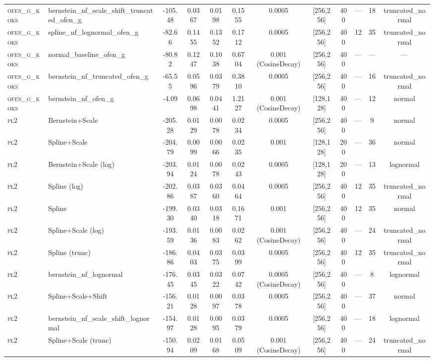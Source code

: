 \begin{table}[htbp]
\begin{tabular}{llS[table-format=-4.2]S[table-format=-4.2]S[table-format=-1.4]S[table-format=-1.4]cccccc}
\textsc{ofen\_g\_koks} & bernstein_nf_scale_shift_truncated_ofen_g & -105.48 & 0.0367 & 0.0198 & 0.1555 & 0.0005 & [256,256] & 400 & — & 18 & truncated_normal \\
\textsc{ofen\_g\_koks} & spline_nf_lognormal_ofen_g & -82.66 & 0.1455 & 0.1352 & 0.1712 & 0.0005 & [256,256] & 400 & 12 & 35 & truncated_normal \\
\textsc{ofen\_g\_koks} & normal_baseline_ofen_g & -80.82 & 0.1247 & 0.1038 & 0.6704 & 0.001 (CosineDecay) & [256,256] & 400 & — & — & — \\
\textsc{ofen\_g\_koks} & bernstein_nf_truncated_ofen_g & -65.55 & 0.0596 & 0.0379 & 0.3810 & 0.0005 & [256,256] & 400 & — & 16 & truncated_normal \\
\textsc{ofen\_g\_koks} & bernstein_nf_ofen_g & -4.09 & 0.0698 & 0.0441 & 1.2127 & 0.001 (CosineDecay) & [128,128] & 400 & — & 12 & normal \\
\textsc{pl2} & Bernstein+Scale & -205.28 & 0.0129 & 0.0078 & 0.0234 & 0.0005 & [256,256] & 400 & — & 9 & normal \\
\textsc{pl2} & Spline+Scale & -204.79 & 0.0099 & 0.0066 & 0.0235 & 0.001 & [128,128] & 200 & — & 36 & normal \\
\textsc{pl2} & Bernstein+Scale (log) & -203.94 & 0.0124 & 0.0078 & 0.0243 & 0.0005 & [128,128] & 200 & — & 13 & lognormal \\
\textsc{pl2} & Spline (log) & -202.86 & 0.0387 & 0.0360 & 0.0464 & 0.0005 & [256,256] & 400 & 12 & 35 & truncated_normal \\
\textsc{pl2} & Spline & -199.30 & 0.0340 & 0.0318 & 0.1671 & 0.001 & [256,256] & 400 & 12 & 35 & normal \\
\textsc{pl2} & Spline+Scale (log) & -193.59 & 0.0136 & 0.0083 & 0.0262 & 0.001 (CosineDecay) & [256,256] & 400 & — & 24 & truncated_normal \\
\textsc{pl2} & Spline (trunc) & -186.86 & 0.0403 & 0.0375 & 0.0399 & 0.0005 & [256,256] & 400 & 12 & 35 & truncated_normal \\
\textsc{pl2} & bernstein_nf_lognormal & -176.45 & 0.0345 & 0.0322 & 0.0742 & 0.0005 (CosineDecay) & [256,256] & 400 & — & 8 & lognormal \\
\textsc{pl2} & Spline+Scale+Shift & -156.21 & 0.0128 & 0.0097 & 0.0378 & 0.0005 & [256,256] & 400 & — & 37 & normal \\
\textsc{pl2} & bernstein_nf_scale_shift_lognormal & -154.97 & 0.0128 & 0.0095 & 0.0379 & 0.0005 & [256,256] & 400 & — & 18 & lognormal \\
\textsc{pl2} & Spline+Scale (trunc) & -150.94 & 0.0209 & 0.0168 & 0.0509 & 0.001 (CosineDecay) & [256,256] & 400 & — & 24 & truncated_normal \\

\end{tabular}
\end{table}
